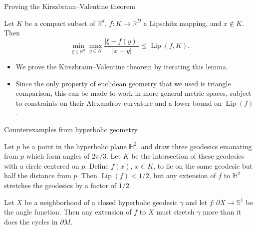 \documentclass[10pt]{beamer}
\newcommand{\RR}{\mathbb{R}}
\DeclareMathOperator{\Lip}{Lip}
\begin{document}
\begin{frame}{Proving the Kirszbraun--Valentine theorem}
\begin{lemma}
Let $K$ be a compact subset of $\RR^d$, $f: K \to \RR^D$ a Lipschitz mapping, and $x \notin K$.
Then
$$\min_{\xi \in \RR^d} \max_{y \in K} \frac{|\xi - f(y)|}{|x - y|} \leq \Lip(f, K).$$
\end{lemma} 

\begin{itemize}
\item We prove the Kirszbraun--Valentine theorem by iterating this lemma. \pause
\item Since the only property of euclidean geometry that we used is triangle comparison, this can be made to work in more general metric spaces, subject to constraints on their Alexandrov curvature and a lower bound on $\Lip(f)$.
\end{itemize}
\end{frame}

\begin{frame}{Counterexamples from hyperbolic geometry}
\begin{example}
Let $p$ be a point in the hyperbolic plane $\mathbb H^2$, and draw three geodesics emanating from $p$ which form angles of $2\pi/3$.
Let $K$ be the intersection of these geodesics with a circle centered on $p$.
Define $f(x)$, $x \in K$, to lie on the same geodesic but half the distance from $p$.
Then $\Lip(f) < 1/2$, but any extension of $f$ to $\mathbb H^2$ stretches the geodesics by a factor of $1/2$. \pause
\end{example}

\begin{example}
Let $X$ be a neighborhood of a closed hyperbolic geodesic $\gamma$ and let $f: \partial X \to \mathbb S^1$ be the angle function.
Then any extension of $f$ to $X$ must stretch $\gamma$ more than it does the cycles in $\partial M$.
\end{example}
\end{frame}
\end{document}
